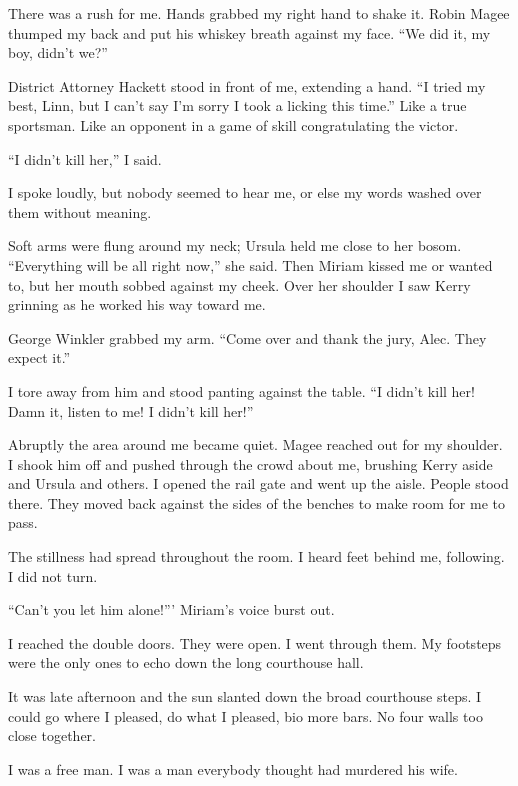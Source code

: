 {There was a rush for me. Hands grabbed my right hand to shake it. Robin Magee thumped my back and put his whiskey breath against my face. “We did it, my boy, didn’t we?”

District Attorney Hackett stood in front of me, extending a hand. “I tried my best, Linn, but I can’t say I’m sorry I took a licking this time.” Like a true sportsman. Like an opponent in a game of skill congratulating the victor.

“I didn’t kill her,” I said.

I spoke loudly, but nobody seemed to hear me, or else my words washed over them without meaning.

Soft arms were flung around my neck; Ursula held me close to her bosom. “Everything will be all right now,” she said. Then Miriam kissed me or wanted to, but her mouth sobbed against my cheek. Over her shoulder I saw Kerry grinning as he worked his way toward me.

George Winkler grabbed my arm. “Come over and thank the jury, Alec. They expect it.”

I tore away from him and stood panting against the table. “I didn’t kill her! Damn it, listen to me! I didn’t kill her!”

Abruptly the area around me became quiet. Magee reached out for my shoulder. I shook him off and pushed through the crowd about me, brushing Kerry aside and Ursula and others. I opened the rail gate and went up the aisle. People stood there. They moved back against the sides of the benches to make room for me to pass.

The stillness had spread throughout the room. I heard feet behind me, following. I did not turn.

“Can’t you let him alone!”’ Miriam’s voice burst out.

I reached the double doors. They were open. I went through them. My footsteps were the only ones to echo down the long courthouse hall.

It was late afternoon and the sun slanted down the broad courthouse steps. I could go where I pleased, do what I pleased, bio more bars. No four walls too close together.

I was a free man. I was a man everybody thought had murdered his wife.

}

\vspace{2\nbs}
\clearpage
\thispagestyle{empty}


